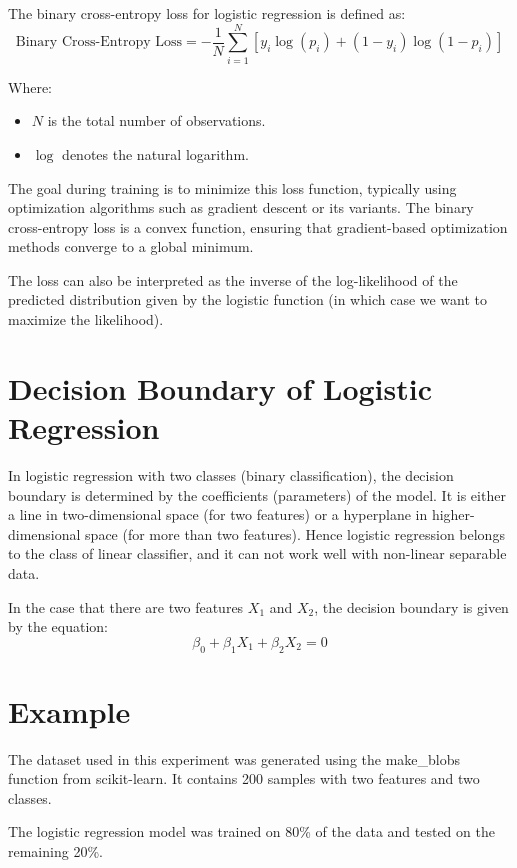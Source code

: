 \documentclass{article}
\begin{document}
The binary cross-entropy loss for logistic regression is defined as:
\[
\text{Binary Cross-Entropy Loss} = -\frac{1}{N} \sum_{i=1}^{N} \left[ y_i \log(p_i) + (1 - y_i) \log(1 - p_i) \right]
\]

Where:
\begin{itemize}
    \item \( N \) is the total number of observations.
    \item \( \log \) denotes the natural logarithm.
\end{itemize}

The goal during training is to minimize this loss function, typically using optimization algorithms such as gradient descent or its variants. The binary cross-entropy loss is a convex function, ensuring that gradient-based optimization methods converge to a global minimum.

The loss can also be interpreted as the inverse of the log-likelihood of the predicted distribution given by the logistic function (in which case we want to maximize the likelihood).

\section{Decision Boundary of Logistic Regression}

In logistic regression with two classes (binary classification), the decision boundary is determined by the coefficients (parameters) of the model. It is either a line in two-dimensional space (for two features) or a hyperplane in higher-dimensional space (for more than two features). Hence logistic regression belongs to the class of linear classifier, and it can not work well with non-linear separable data.

In the case that there are two features \( X_1 \) and \( X_2 \), the decision boundary is given by the equation:
\[
\beta_0 + \beta_1 X_1 + \beta_2 X_2 = 0
\]

\section{Example}

The dataset used in this experiment was generated using the make\_blobs function from scikit-learn. It contains 200 samples with two features and two classes.

The logistic regression model was trained on 80\% of the data and tested on the remaining 20\%. 
\end{document}
